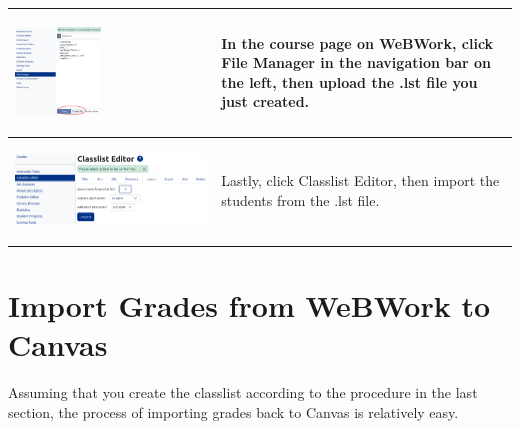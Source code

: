 \documentclass{article}
\begin{document}
{\begin{longtable}{|l|l|}
\begin{parbox}{0.45\textwidth}{\includegraphics[width=0.45\textwidth]{fileManager.png}}
\end{parbox}&\begin{parbox}{0.45\textwidth}{In the course page on WeBWork, click File Manager in the navigation bar on the left, then upload the .lst file you just created.}
\end{parbox}\\
\hline
\begin{parbox}{0.45\textwidth}{\includegraphics[width=.45\textwidth]{classlistEditor.png}}
\end{parbox}&\begin{parbox}{0.45\textwidth}{Lastly, click Classlist Editor, then import the students from the .lst file.}
\end{parbox}\\
\hline
\end{longtable}
}
\section{Import Grades from WeBWork to Canvas}
Assuming that you create the classlist according to the procedure in the last section, the process of importing grades back to Canvas is relatively easy.
\end{document}
